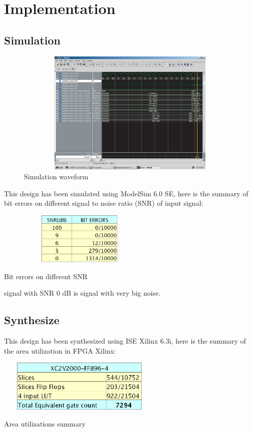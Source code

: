 \documentclass[a4paper,12pt]{report}
\begin{document}
\chapter{Implementation}

\vspace{2cm}
\section{Simulation}

\begin{figure}[H]
\center
\includegraphics[width=12cm,height=6cm]{screenshot.eps}
\caption{Simulation waveform}
\label{simulation waveform}
\end{figure}

This design has been simulated using ModelSim 6.0 SE, here is the
summary of bit errors on different signal to noise ratio (SNR) of input
signal:

\begin{table}[H]
\center
\includegraphics[width=8cm,height=2.5cm]{bit_errors.eps}
\caption{Bit errors on different SNR}
\label{bit_errors}
\end{table}

signal with SNR 0 dB is signal with very big noise.

\section{Synthesize}

This design has been synthesized using ISE Xilinx 6.3i, here is the
summary of the area utilization in FPGA Xilinx:

\begin{table}[H]
\center
\includegraphics[width=8cm,height=2.5cm]{area.eps}
\caption{Area utilizations summary}
\label{area}
\end{table}
\end{document}
